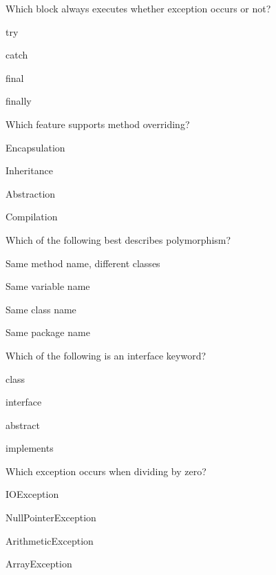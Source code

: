 \documentclass{CWNUExam}
\begin{document}
\begin{question}
Which block always executes whether exception occurs or not?
\paren
\begin{choices}
\item try
\item catch
\item final
\item finally
\end{choices}
\end{question}

\begin{question}
Which feature supports method overriding?
\paren
\begin{choices}
\item Encapsulation
\item Inheritance
\item Abstraction
\item Compilation
\end{choices}
\end{question}

\begin{question}
Which of the following best describes polymorphism?
\paren
\begin{choices}
\item Same method name, different classes
\item Same variable name
\item Same class name
\item Same package name
\end{choices}
\end{question}

\begin{question}
Which of the following is an interface keyword?
\paren
\begin{choices}
\item class
\item interface
\item abstract
\item implements
\end{choices}
\end{question}

\begin{question}
Which exception occurs when dividing by zero?
\paren
\begin{choices}
\item IOException
\item NullPointerException
\item ArithmeticException
\item ArrayException
\end{choices}
\end{question}
\end{document}
